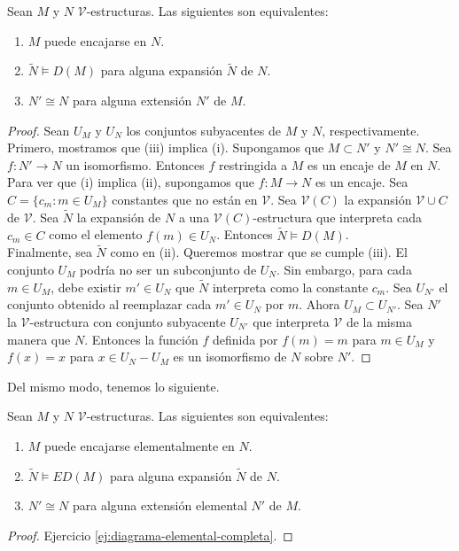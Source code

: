 \message{ !name(main.tex)}\documentclass[12pt,a4paper]{book}
\newcommand{\VV}{\mathcal{V}}
\begin{document}
    \begin{proposicion}\label{prop:equivalencia-encaje-diagrama}
        Sean $M$ y $N$ $\VV$-estructuras. Las siguientes son equivalentes:
        \begin{enumerate}
            \item[(i)] $M$ puede encajarse en $N$.
            \item[(ii)] $\widetilde{N}\models D(M)$ para alguna expansión $\widetilde{N}$ de $N$.
            \item[(iii)] $N'\cong N$ para alguna extensión $N'$ de $M$.
        \end{enumerate}
    \end{proposicion}
    \begin{proof}
        Sean $U_{M}$ y $U_{N}$ los conjuntos subyacentes de $M$ y $N$, respectivamente.\\
        Primero, mostramos que (iii) implica (i). Supongamos que $M\subset N'$ y $N'\cong N$. Sea $f:N'\rightarrow N$ un
        isomorfismo. Entonces $f$ restringida a $M$ es un encaje de $M$ en $N$.\\
        Para ver que (i) implica (ii), supongamos que $f:M\rightarrow N$ es un encaje. Sea $C=\{c_{m}:m\in U_{M}\}$
        constantes que no están en $\VV$. Sea $\VV(C)$ la expansión $\VV\cup C$ de $\VV$. Sea $\widetilde{N}$ la expansión
        de $N$ a una $\VV(C)$-estructura que interpreta cada $c_{m}\in C$ como el elemento $f(m)\in U_{N}$. Entonces
        $\widetilde{N}\models D(M)$.\\
        Finalmente, sea $\widetilde{N}$ como en (ii). Queremos mostrar que se cumple (iii). El conjunto $U_{M}$ podría no
        ser un subconjunto de $U_{N}$. Sin embargo, para cada $m\in U_{M}$, debe existir $m'\in U_{N}$ que $\widetilde{N}$
        interpreta como la constante $c_{m}$. Sea $U_{N'}$ el conjunto obtenido al reemplazar cada $m'\in U_{N}$ por $m$.
        Ahora $U_{M}\subset U_{N'}$. Sea $N'$ la $\VV$-estructura con conjunto subyacente $U_{N'}$ que interpreta $\VV$ de
        la misma manera que $N$. Entonces la función $f$ definida por $f(m)=m$ para $m\in U_{M}$ y $f(x)=x$ para
        $x\in U_{N}-U_{M}$ es un isomorfismo de $N$ sobre $N'$.
    \end{proof}

    Del mismo modo, tenemos lo siguiente.

    \begin{proposicion}\label{prop:equivalencia-encaje-elemental-diagrama}
        Sean $M$ y $N$ $\VV$-estructuras. Las siguientes son equivalentes:
        \begin{enumerate}
            \item[(i)] $M$ puede encajarse elementalmente en $N$.
            \item[(ii)] $\widetilde{N}\models ED(M)$ para alguna expansión $\widetilde{N}$ de $N$.
            \item[(iii)] $N'\cong N$ para alguna extensión elemental $N'$ de $M$.
        \end{enumerate}
    \end{proposicion}
    \begin{proof}
        Ejercicio \ref{ej:diagrama-elemental-completa}.
    \end{proof}
\end{document}
